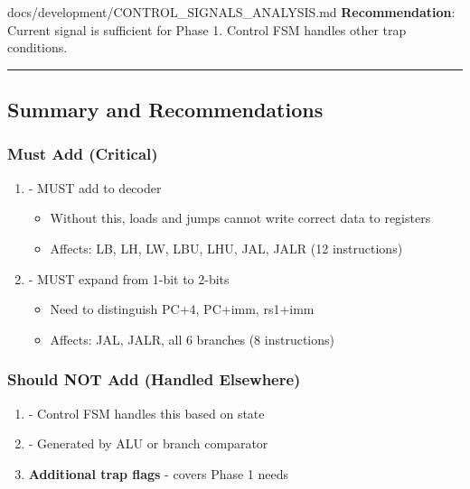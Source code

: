 \begin{relocated}{docs/development/CONTROL_SIGNALS_ANALYSIS.md}
\textbf{Recommendation}: \ok{} Current  signal is
sufficient for Phase 1. Control FSM handles other trap conditions.

\begin{center}\rule{0.5\linewidth}{0.5pt}\end{center}

\subsection{Summary and Recommendations}\label{tm:flow:control-signals-analysis:summary-and-recommendations}

\subsubsection{Must Add (Critical)}\label{tm:flow:control-signals-analysis:must-add-critical}

\begin{enumerate}
\def\labelenumi{\arabic{enumi}.}
\item
  \ok{} \textbf{} - MUST add to decoder

  \begin{itemize}
  \tightlist
  \item
    Without this, loads and jumps cannot write correct data to registers
  \item
    Affects: LB, LH, LW, LBU, LHU, JAL, JALR (12 instructions)
  \end{itemize}
\item
  \ok{} \textbf{} - MUST expand from 1-bit to 2-bits

  \begin{itemize}
  \tightlist
  \item
    Need to distinguish PC+4, PC+imm, rs1+imm
  \item
    Affects: JAL, JALR, all 6 branches (8 instructions)
  \end{itemize}
\end{enumerate}

\subsubsection{Should NOT Add (Handled Elsewhere)}\label{tm:flow:control-signals-analysis:should-not-add-handled-elsewhere}

\begin{enumerate}
\def\labelenumi{\arabic{enumi}.}
\tightlist
\item
  \bad{} \textbf{} - Control FSM handles this based on
  state
\item
  \bad{} \textbf{} - Generated by ALU or branch
  comparator
\item
  \bad{} \textbf{Additional trap flags} -  covers Phase 1
  needs
\end{enumerate}


\end{relocated}
